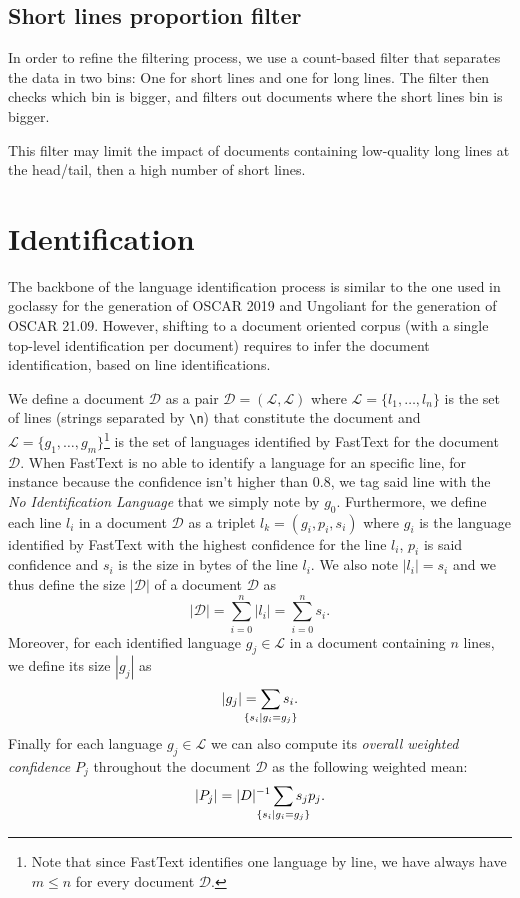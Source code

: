 \subsection{Short lines proportion filter}

In order to refine the filtering process, we use a count-based filter that separates the data in two bins: One for short lines and one for long lines. The filter then checks which bin is bigger, and filters out documents where the short lines bin is bigger.

This filter may limit the impact of documents containing low-quality long lines at the head/tail, then a high number of short lines.


\section{Identification}

The backbone of the language identification process is similar to the one used in goclassy \cite{ortiz-suarez-etal-2019-asynchronous} for the generation of OSCAR 2019 and Ungoliant \cite{abadji-etal-2021-ungoliant} for the generation of OSCAR 21.09. However, shifting to a document oriented corpus (with a single top-level identification per document) requires to infer the document identification, based on line identifications.


We define a document $\mathcal{D}$ as a pair $\mathcal{D}=(\mathcal{L}, \mathscr{L})$ where $\mathcal{L}=\{l_1,\ldots,l_n\}$ is the set of lines (strings separated by \texttt{\textbackslash n}) that constitute the document and $\mathscr{L} = \{g_1, \ldots, g_m\}$\footnote{Note that since FastText identifies one language by line, we have always have $m\le n$ for every document $\mathcal{D}$.} is the set of languages identified by FastText for the document $\mathcal{D}$. When FastText is no able to identify a language for an specific line, for instance because the confidence isn't higher than $0.8$, we tag said line with the \emph{No Identification Language} that we simply note by $g_0$. Furthermore, we define each line $l_i$ in a document $\mathcal{D}$ as a triplet $l_k=(g_i, p_i, s_i)$ where $g_i$ is the language identified by FastText with the highest confidence for the line $l_i$, $p_i$ is said confidence and $s_i$ is the size in bytes of the line $l_i$. We also note $|l_i|=s_i$ and we thus define the size $|\mathcal{D}|$ of a document $\mathcal{D}$ as
\[
    |\mathcal{D}| = \sum_{i=0}^{n} |l_i| = \sum_{i=0}^{n} s_i.
\]
Moreover, for each identified language $g_j \in \mathscr{L}$ in a document containing $n$ lines, we define its size $|g_j|$ as
\[
    |g_j| = \sum_{\mathclap{\{s_i \mid g_i = g_j\}}} s_i.
\]
Finally for each language $g_j \in \mathscr{L}$ we can also compute its \emph{overall weighted confidence} $P_j$ throughout the document $\mathcal{D}$ as the following weighted mean:
\[
    |P_j| = |D|^{-1}\sum_{\mathclap{\{s_i|g_i=g_j\}}} s_jp_j.
\]

